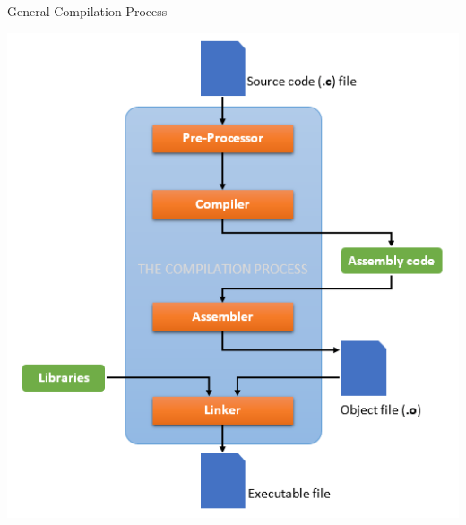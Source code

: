 \documentclass{beamer}
\begin{document}
\begin{frame}{General Compilation Process}
    \begin{overprint}
        \centering
        \includegraphics[scale=0.4]{images/high_level_compilation.png}


\end{overprint}
\end{frame}
\end{document}
